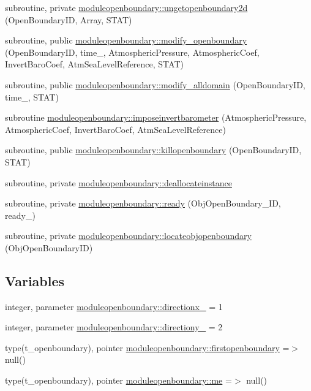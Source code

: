 \begin{DoxyCompactItemize}
\item 
subroutine, private \mbox{\hyperlink{namespacemoduleopenboundary_a601c9cebbb40986b76e9488a0af4dc3a}{moduleopenboundary\+::ungetopenboundary2d}} (Open\+Boundary\+ID, Array, S\+T\+AT)
\item 
subroutine, public \mbox{\hyperlink{namespacemoduleopenboundary_ab4eb76c328f66777a2d624134933208e}{moduleopenboundary\+::modify\+\_\+openboundary}} (Open\+Boundary\+ID, time\+\_\+, Atmospheric\+Pressure, Atmospheric\+Coef, Invert\+Baro\+Coef, Atm\+Sea\+Level\+Reference, S\+T\+AT)
\item 
subroutine, public \mbox{\hyperlink{namespacemoduleopenboundary_aff2a2f4ab16c35a036f9e00575fed103}{moduleopenboundary\+::modify\+\_\+alldomain}} (Open\+Boundary\+ID, time\+\_\+, S\+T\+AT)
\item 
subroutine \mbox{\hyperlink{namespacemoduleopenboundary_a286febb2e6ff9645adfa5b2e89882bcb}{moduleopenboundary\+::imposeinvertbarometer}} (Atmospheric\+Pressure, Atmospheric\+Coef, Invert\+Baro\+Coef, Atm\+Sea\+Level\+Reference)
\item 
subroutine, public \mbox{\hyperlink{namespacemoduleopenboundary_aeb84e486854c5a1124aae3804680b09b}{moduleopenboundary\+::killopenboundary}} (Open\+Boundary\+ID, S\+T\+AT)
\item 
subroutine, private \mbox{\hyperlink{namespacemoduleopenboundary_a6b40de889bc24c11e911ca6efb54e645}{moduleopenboundary\+::deallocateinstance}}
\item 
subroutine, private \mbox{\hyperlink{namespacemoduleopenboundary_af8f8c38fee04ad167eec9a779f717d85}{moduleopenboundary\+::ready}} (Obj\+Open\+Boundary\+\_\+\+ID, ready\+\_\+)
\item 
subroutine, private \mbox{\hyperlink{namespacemoduleopenboundary_a574d2a20bc25ffca8219ecde4cb1c29f}{moduleopenboundary\+::locateobjopenboundary}} (Obj\+Open\+Boundary\+ID)
\end{DoxyCompactItemize}
\subsection*{Variables}
\begin{DoxyCompactItemize}
\item 
integer, parameter \mbox{\hyperlink{namespacemoduleopenboundary_a34fb62c3d7f54754cad4022cbdadaa4f}{moduleopenboundary\+::directionx\+\_\+}} = 1
\item 
integer, parameter \mbox{\hyperlink{namespacemoduleopenboundary_a25093200fa39f8e59e871125514b1a8c}{moduleopenboundary\+::directiony\+\_\+}} = 2
\item 
type(t\+\_\+openboundary), pointer \mbox{\hyperlink{namespacemoduleopenboundary_a6692caf14af89aa0ebe8696badd01729}{moduleopenboundary\+::firstopenboundary}} =$>$ null()
\item 
type(t\+\_\+openboundary), pointer \mbox{\hyperlink{namespacemoduleopenboundary_a44c6fe241aef5c76ee470c9d68f19a74}{moduleopenboundary\+::me}} =$>$ null()
\end{DoxyCompactItemize}
